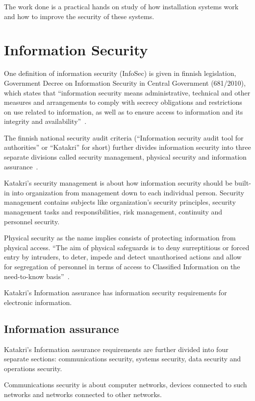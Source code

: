 The work done is a practical hands on study of how installation
systems work and how to improve the security of these systems.


\section{Information Security}

One definition of information security (InfoSec) is given in finnish
legislation, Government Decree on Information Security in Central
Government (681/2010), which states that ``information security means
administrative, technical and other measures and arrangements to
comply with secrecy obligations and restrictions on use related to
information, as well as to ensure access to information and its
integrity and availability''~\cite{finlex-infosec-in-gov}.

The finnish national security audit criteria (``Information security
audit tool for authorities'' or ``Katakri'' for short) further divides
information security into three separate divisions called security
management, physical security and information
assurance~\cite{katakri}.

Katakri's security management is about how information security should
be built-in into organization from management down to each individual
person. Security management contains subjects like organization's
security principles, security management tasks and responsibilities,
risk management, continuity and personnel security.

Physical security as the name implies consists of protecting
information from physical access. ``The aim of physical safeguards is
to deny surreptitious or forced entry by intruders, to deter, impede
and detect unauthorised actions and allow for segregation of personnel
in terms of access to Classified Information on the need-to-know
basis''~\cite{katakri}.

Katakri's Information assurance has information security requirements
for electronic information.


\subsection{Information assurance}

Katakri's Information assurance requirements are further divided into
four separate sections: communications security, systems security,
data security and operations security.

Communications security is about computer networks, devices connected
to such networks and networks connected to other networks. 

